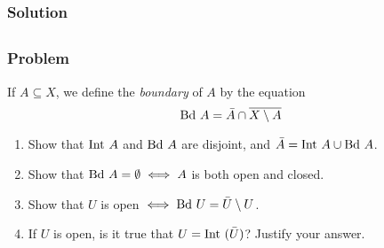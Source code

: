 \subsubsection{Solution}
\todo


\subsection{}
\subsubsection{Problem}
If $A \subseteq X$, we define the \emph{boundary} of $A$ by the equation
\[\mathrm{Bd\ } A = \bar A \cap \overline{X \setminus A}\]
\begin{enumerate}
\item Show that $\mathrm{Int\ } A$ and $\mathrm{Bd\ } A$ are disjoint, and $\bar A = \mathrm{Int\ } A \cup \mathrm{Bd\ } A$.
\item Show that $\mathrm{Bd\ } A = \emptyset \iff A$ is both open and closed.
\item Show that $U$ is open $\iff \mathrm{Bd\ } U = \bar U \setminus U$.
\item If $U$ is open, is it true that $U = \mathrm{Int\ }(\bar U)$? Justify your answer.
\end{enumerate}

